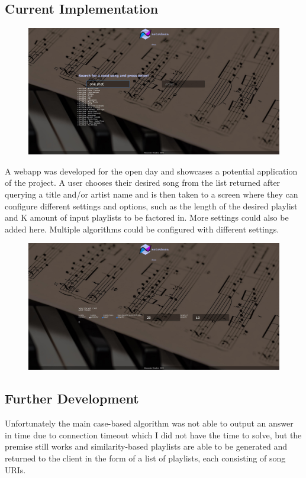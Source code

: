 \documentclass[a4paper, 12pt]{report}
\begin{document}
\subsection*{Current Implementation}
\begin{figure}[H]
    \centering
    \includegraphics[width=\textwidth]{webapp.jpeg}
\end{figure}

A webapp was developed for the open day and showcases a potential application of the project.
A user chooses their desired song from the list returned after querying a title and/or artist name and is then taken to a screen where they can configure
different settings and options, such as the length of the desired playlist and K amount of input playlists to be factored in. More settings could also be added here.
Multiple algorithms could be configured with different settings.

\begin{figure}[H]
    \centering
    \includegraphics[width=\textwidth]{webapp2.jpeg}
\end{figure}

\subsection*{Further Development}
Unfortunately the main case-based algorithm was not able to output an answer in time due to connection timeout which I did not have the time to solve,
but the premise still works and similarity-based playlists are able to be generated and returned to the client in the form of a list of playlists, each consisting of song URIs.
\end{document}
